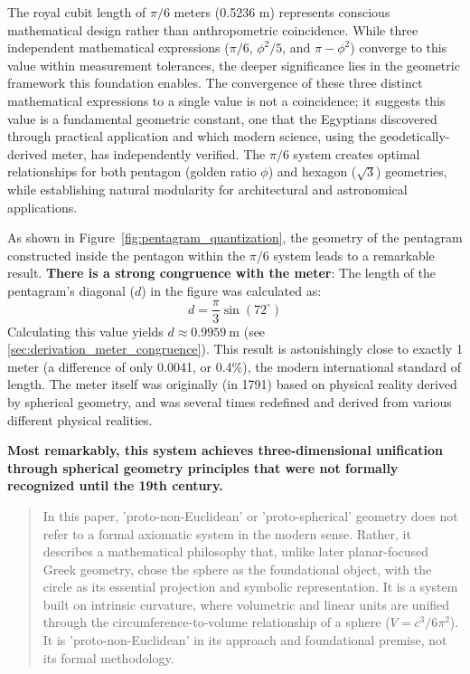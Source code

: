 \documentclass[11pt]{article}
\begin{document}
The royal cubit length of $\pi/6$ meters (0.5236 m) represents conscious mathematical design rather than anthropometric coincidence. While three independent mathematical expressions ($\pi/6$, $\phi^2/5$, and $\pi - \phi^2$) converge to this value within measurement tolerances, the deeper significance lies in the geometric framework this foundation enables. The convergence of these three distinct mathematical expressions to a single value is not a coincidence; it suggests this value is a fundamental geometric constant, one that the Egyptians discovered through practical application and which modern science, using the geodetically-derived meter, has independently verified. The $\pi/6$ system creates optimal relationships for both pentagon (golden ratio $\phi$) and hexagon ($\sqrt{3}$) geometries, while establishing natural modularity for architectural and astronomical applications.

As shown in Figure~\ref{fig:pentagram_quantization}, the geometry of the pentagram constructed inside the pentagon within the $\pi/6$ system leads to a remarkable result. 
\textbf{There is a strong congruence with the meter}: The length of the pentagram's diagonal ($d$) in the figure was calculated as:
\[
d = \frac{\pi}{3} \sin(72^\circ)
\]
Calculating this value yields $d \approx \SI{0.9959}{\meter}$ (see \ref{sec:derivation_meter_congruence}). This result is astonishingly close to exactly 1 meter (a difference of only 0.0041, or 0.4\%), the modern international standard of length. The meter itself was originally (in 1791) based on physical reality derived by spherical geometry, and was several times redefined and derived from various different physical realities.

\textbf{Most remarkably, this system achieves three-dimensional unification through spherical geometry principles that were not formally recognized until the 19th century.}
\begin{quote}
In this paper, 'proto-non-Euclidean' or 'proto-spherical' geometry does not refer to a formal axiomatic system in the modern sense. Rather, it describes a mathematical philosophy that, unlike later planar-focused Greek geometry, chose the sphere as the foundational object, with the circle as its essential projection and symbolic representation. It is a system built on intrinsic curvature, where volumetric and linear units are unified through the circumference-to-volume relationship of a sphere ($V = c^3/6\pi^2$). It is 'proto-non-Euclidean' in its approach and foundational premise, not its formal methodology.
\end{quote}
\end{document}
